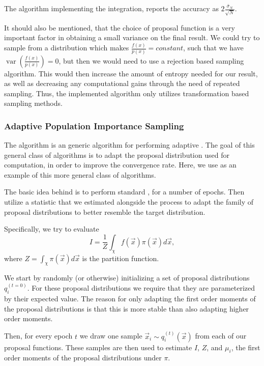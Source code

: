 \documentclass[10pt, a4paper]{article}
\begin{document}
  The algorithm implementing the \is{} integration, reports the accuracy as
  $2\frac{\bar\sigma_N}{\sqrt N}$.

  It should also be mentioned, that the choice of proposal function is a very important factor in
  obtaining a small variance on the final result. We could try to sample from a distribution which
  makes $\frac{f(x)}{p(x)} = constant$, such that we have
  $\operatorname{var}\left(\frac{f(x)}{p(x)}\right) = 0$, but then we would need to use a rejection
  based sampling algorithm\footnotemark. This would then increase the amount of entropy needed for our result,
  as well as decreasing any computational gains through the need of repeated sampling. Thus, the implemented
  algorithm only utilizes transformation based sampling methods.


  \subsubsection{Adaptive Population Importance Sampling}
  The \apis{} algorithm is an generic algorithm for performing adaptive \is{}. The goal
  of this general class of algorithms is to adapt the proposal distribution used for computation, in
  order to improve the convergence rate. Here, we use \apis{} as an example of this more general class
  of algorithms.

  The basic idea behind \apis{} is to perform standard \is{}, for a number of epochs.
  Then utilize a statistic that we estimated alongside the \is{} process to adapt
  the family of proposal distributions to better resemble the target distribution\cite{apis}.

  Specifically, we try to evaluate
  \begin{equation}
  I = \frac{1}{Z} \int_\chi f(\vec{x}) \pi(\vec{x}) d\vec{x},
  \end{equation}
  where $Z = \int_\chi \pi(\vec{x}) d\vec{x}$ is the partition function.

  We start by randomly (or otherwise) initializing a set of proposal distributions $q_i^{(t=0)}$.
  For these proposal distributions we require that they are parameterized by their expected value\cite{apis}.
  The reason for only adapting the first order moments of the proposal distributions is that this is
  more stable than also adapting higher order moments\cite{apis}.

  Then, for every epoch $t$ we draw one sample $\vec{x}_i \sim q_i^{(t)}(\vec{x})$ from each
  of our proposal functions. These samples are then used to estimate $I$, $Z$, and $\mu_i$, the first
  order moments of the proposal distributions under $\pi$.
\end{document}
